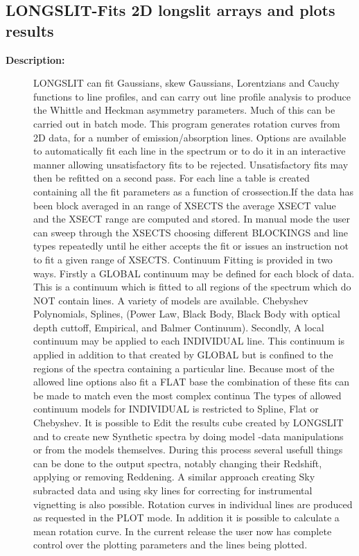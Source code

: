 \subsection{LONGSLIT-\label{LONGSLIT}Fits 2D longslit arrays and plots results}
\begin{description}

\item [{\bf Description:}]
   LONGSLIT can fit Gaussians, skew Gaussians, Lorentzians and Cauchy
   functions to line profiles, and can carry out line profile analysis to
   produce the Whittle and Heckman asymmetry parameters. Much of this
   can be carried out in batch mode.
     This program generates rotation curves from 2D data, for a number
   of emission/absorption lines.
     Options are available to automatically fit each line in the
   spectrum or to do it in an interactive manner allowing unsatisfactory
   fits to be rejected. Unsatisfactory fits may then be refitted on a
   second pass.
     For each line a table is created containing all the fit parameters
   as a function of crossection.If the data has been block averaged in
   an range of XSECTS the average XSECT value and the XSECT range are
   computed and stored.
     In manual mode the user can sweep through the XSECTS choosing
   different BLOCKINGS and line types repeatedly until he either
   accepts the fit or issues an instruction not to fit a given range of
   XSECTS.
     Continuum Fitting is provided in two ways. Firstly a GLOBAL
   continuum may be defined for each block of data. This is a continuum
   which is fitted to all regions of the spectrum which do NOT contain
   lines. A variety of models are available.
   Chebyshev Polynomials, Splines, (Power Law, Black Body, Black Body
   with optical depth cuttoff, Empirical, and Balmer Continuum).
   Secondly, A local continuum may be applied to each INDIVIDUAL
   line. This continuum is applied in addition to that created
   by GLOBAL but is confined to the regions of the spectra
   containing a particular line. Because most of the allowed
   line options also fit a FLAT base the combination of these
   fits can be made to match even the most complex continua
   The types of allowed continuum models for INDIVIDUAL is
   restricted to Spline, Flat or Chebyshev.
     It is possible to Edit the results cube created by LONGSLIT
   and to create new Synthetic spectra by doing model -data
   manipulations or from the models themselves. During this
   process several usefull things can be done to the output
   spectra, notably changing their Redshift, applying or
   removing Reddening.
     A similar approach creating Sky subracted data and using sky
   lines for correcting for instrumental vignetting is also possible.
     Rotation curves in individual lines are produced as requested in
   the PLOT mode. In addition it is possible to calculate a mean
   rotation curve. In the current release the user now has complete
   control over the plotting parameters and the lines being
   plotted.


\end{description}
